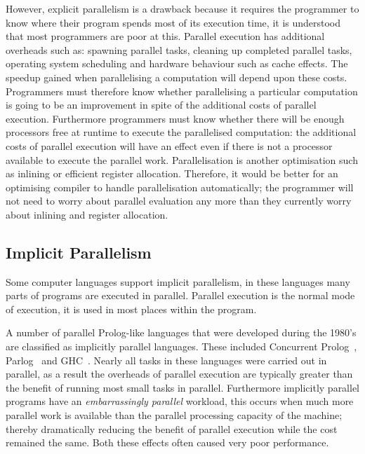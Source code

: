 However, explicit parallelism is a drawback because it requires the
programmer to know where their program spends most of its execution
time, it is understood that most programmers are poor at this.
Parallel execution has additional overheads such as:
spawning parallel tasks,
cleaning up completed parallel tasks,
operating system scheduling and
hardware behaviour such as cache effects.
The speedup gained when parallelising a computation will depend upon
these costs.
Programmers must therefore know whether parallelising a particular
computation is going to be an improvement in spite of the additional
costs of parallel execution.
Furthermore programmers must know whether there will be enough
processors free at runtime to execute the parallelised computation:
the additional costs of parallel execution will have an effect even
if there is not a processor available to execute the parallel work.
Parallelisation is another optimisation such as inlining or efficient
register allocation.
Therefore,
it would be better for an optimising compiler to handle parallelisation
automatically;
the programmer will not need to worry about parallel evaluation any more
than they currently worry about inlining and register allocation.

\subsection{Implicit Parallelism}
\label{sec:lit_implicit-parallelism}

Some computer languages support implicit parallelism,
in these languages many parts of programs are executed in parallel.
Parallel execution is the normal mode of execution,
it is used in most places within the program.

A number of parallel Prolog-like languages that were developed during the
1980's are classified as implicitly parallel languages.
These included Concurrent
Prolog~\citep{saraswat85:probl_with_concur_prolog,saraswat86:concurrent_prolog_definition,shapiro:flat_concur_prolog},
Parlog~\citep{clark:84:parlog_sys_prog,clark:86:parlog} and GHC~\citep{ueda:ghc}.
Nearly all tasks in these languages were carried out in
parallel,
as a result the overheads of parallel execution are typically
greater than the benefit of running most small tasks in parallel.
Furthermore implicitly parallel programs have an \emph{embarrassingly
  parallel} workload,
this occurs when much more parallel work is available than the parallel
processing capacity of the machine;
thereby dramatically reducing the benefit of parallel execution while
the cost remained the same.
Both these effects often caused very poor performance.


